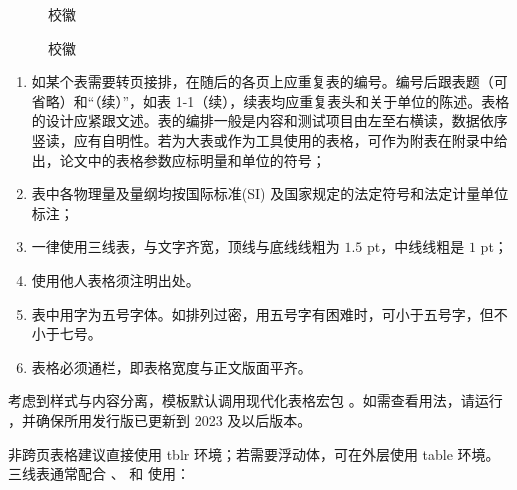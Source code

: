 \begin{texcodeonly}[]{}
  \begin{figure}[h]
    \subfigg    \subfigg
    \subfigg    \subfigg
    \subfigg    \subfigg
    \caption{校徽}
  \end{figure}
\end{texcodeonly}

\begin{figure}[h]
  \subfigg    \subfigg
  \subfigg    \subfigg
  \subfigg    \subfigg
  \caption{校徽}
\end{figure}


\clearpage


\begin{tcolorbox}[colback=red!5!white,colframe=red!75!black]
  \begin{enumerate}[leftmargin=0.5cm]
    \item 如某个表需要转页接排，在随后的各页上应重复表的编号。编号后跟表题（可省略）和“（续）”，如表 1-1（续），续表均应重复表头和关于单位的陈述。表格的设计应紧跟文述。表的编排一般是内容和测试项目由左至右横读，数据依序竖读，应有自明性。若为大表或作为工具使用的表格，可作为附表在附录中给出，论文中的表格参数应标明量和单位的符号；
    \item 表中各物理量及量纲均按国际标准(SI) 及国家规定的法定符号和法定计量单位标注；
    \item 一律使用三线表，与文字齐宽，顶线与底线线粗为 $1.5$ pt，中线线粗是 $1$ pt；
    \item 使用他人表格须注明出处。
    \item 表中用字为五号字体。如排列过密，用五号字有困难时，可小于五号字，但不小于七号。
    \item 表格必须通栏，即表格宽度与正文版面平齐。
  \end{enumerate}
\end{tcolorbox}




考虑到样式与内容分离，模板默认调用现代化表格宏包 。如需查看用法，请运行 ，并确保所用发行版已更新到 2023 及以后版本。

非跨页表格建议直接使用 tblr 环境；若需要浮动体，可在外层使用 table 环境。三线表通常配合 \clist{\toprule}、\clist{\midrule} 和 \clist{\bottomrule} 使用：

